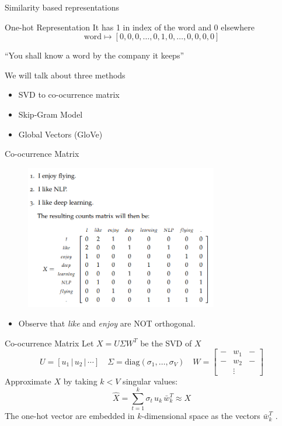\documentclass[handout]{beamer}
\newcommand{\given}{\, | \,}
\newcommand{\diag}{\text{diag}}
\begin{document}
\begin{frame}{Similarity based representations}
    \begin{block}{One-hot Representation}
        It has 1 in index of the word and 0 elsewhere
        $$\text{word} \mapsto [0,0,0,\ldots,0,1,0,\ldots,0,0,0,0]$$
    \end{block}
    ``You shall know a word by the company it keeps''\\[5mm]
    \hspace*{}

    We will talk about three methods
    \begin{itemize}
            \item SVD to co-ocurrence matrix
            \item Skip-Gram Model
            \item Global Vectors (GloVe)
    \end{itemize}

\end{frame}

\begin{frame}{Co-ocurrence Matrix}
    \begin{figure}[c]
    \includegraphics[width=0.75\textwidth]{coocurrence_matrix.png}
    \end{figure}
    \begin{itemize}
        \item Observe that \textit{like} and \textit{enjoy} are NOT orthogonal.
    \end{itemize}
\end{frame}

\begin{frame}{Co-ocurrence Matrix}
Let $X = U\Sigma W^T$ be the SVD of $X$
    $$ U = [u_1 \given u_2\given \cdots ]\quad \Sigma = \diag(\sigma_1,\ldots, \sigma_V)\quad W = \begin{bmatrix}-& w_1&- \\-& w_2&- \\ &\vdots& \end{bmatrix}$$
        Approximate $X$ by taking $k<V$ singular values:
        $$\hat X = \sum_{t=1}^k \sigma_t\, u_k\, \bar w_k^T\approx X$$
        The one-hot vector are embedded in $k$-dimensional space as the vectors $\bar w_k^T$ .
\end{frame}
\end{document}

